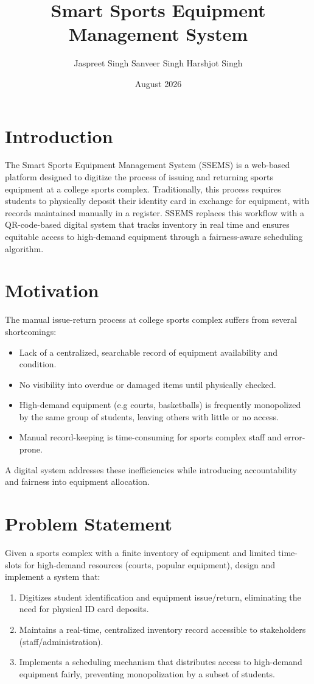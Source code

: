\documentclass{article}
\title{Smart Sports Equipment Management System}
\author{Jaspreet Singh Sanveer Singh Harshjot Singh}
\date{August 2026}
\begin{document}
\maketitle

\section{Introduction}
The Smart Sports Equipment Management System (SSEMS) is a web-based platform designed to digitize the process of issuing and returning sports equipment at a college sports complex. Traditionally, this process requires students to physically deposit their identity card in exchange for equipment, with records maintained manually in a register. SSEMS replaces this workflow with a QR-code-based digital system that tracks inventory in real time and ensures equitable access to high-demand equipment through a fairness-aware scheduling algorithm.

\section{Motivation}
The manual issue-return process at college sports complex suffers from several shortcomings:
\begin{itemize}
    \item Lack of a centralized, searchable record of equipment availability and condition.
    \item No visibility into overdue or damaged items until physically checked.
    \item High-demand equipment (e.g courts, basketballs) is frequently monopolized by the same group of students, leaving others with little or no access.
    \item Manual record-keeping is time-consuming for sports complex staff and error-prone.
\end{itemize}
A digital system addresses these inefficiencies while introducing accountability and fairness into equipment allocation.

\section{Problem Statement}
Given a sports complex with a finite inventory of equipment and limited time-slots for high-demand resources (courts, popular equipment), design and implement a system that:
\begin{enumerate}
    \item Digitizes student identification and equipment issue/return, eliminating the need for physical ID card deposits.
    \item Maintains a real-time, centralized inventory record accessible to stakeholders (staff/administration).
    \item Implements a scheduling mechanism that distributes access to high-demand equipment fairly, preventing monopolization by a subset of students.
\end{enumerate}
\end{document}

